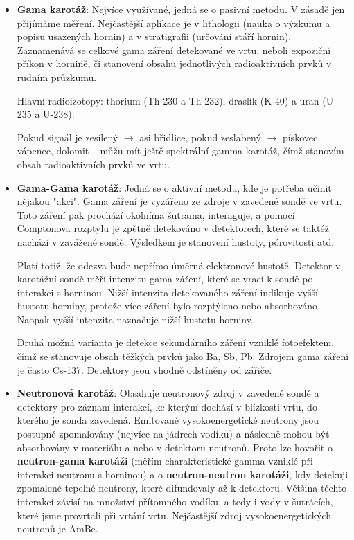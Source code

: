 \begin{itemize}
    \item \textbf{Gama karotáž}: Nejvíce využívané, jedná se o pasivní metodu. V zásadě jen přijímáme měření. Nejčastější aplikace je v lithologii (nauka o výzkumu a popisu usazených hornin) a v stratigrafii (určování stáří hornin). Zaznamenává se celkové gama záření detekované ve vrtu, neboli expoziční příkon v hornině, či stanovení obsahu jednotlivých radioaktivních prvků v rudním průzkumu. 
    
    Hlavní radioizotopy: thorium (Th-230 a Th-232), draslík (K-40) a uran (U-235 a U-238).
    
    Pokud signál je zesílený $\rightarrow$ asi břidlice, pokud zeslabený $\rightarrow$ pískovec, vápenec, dolomit -- můžu mít ještě spektrální gamma karotáž, čímž stanovím obsah radioaktivních prvků ve vrtu.

    \item \textbf{Gama-Gama karotáž}: Jedná se o aktivní metodu, kde je potřeba učinit nějakou "akci". Gama záření je vyzářeno ze zdroje v zavedené sondě ve vrtu. Toto záření pak prochází okolníma šutrama, interaguje, a pomocí Comptonova rozptylu je zpětně detekováno v detektorech, které se taktéž nachází v zavážené sondě. Výsledkem je stanovení hustoty, pórovitosti atd.
    
    Platí totiž, že odezva bude nepřímo úměrná elektronové hustotě. Detektor v karotážní sondě měří intenzitu gama záření, které se vrací k sondě po interakci s horninou. Nižší intenzita detekovaného záření indikuje vyšší hustotu horniny, protože více záření bylo rozptýleno nebo absorbováno. Naopak vyšší intenzita naznačuje nižší hustotu horniny. 
    
    Druhá možná varianta je detekce sekundárního záření vzniklé fotoefektem, čímž se stanovuje obsah těžkých prvků jako Ba, Sb, Pb. Zdrojem gama záření je často Cs-137. Detektory jsou vhodně odstíněny od zářiče.

    \item \textbf{Neutronová karotáź}: Obsahuje neutronový zdroj v zavedené sondě a detektory pro záznam interakcí, ke kterým dochází v blízkosti vrtu, do kterého je sonda zavedená. Emitované vysokoenergetické neutrony jsou postupně zpomalovány (nejvíce na jádrech vodíku) a následně mohou být absorbovány v materiálu a nebo v detektoru neutronů. Proto lze hovořit o \textbf{neutron-gama karotáži} (měřím charakteristické gamma vzniklé při interakci neutronu s horninou) a o \textbf{neutron-neutron karotáži}, kdy detekuji zpomalené tepelné neutrony, které difundovaly až k detektoru. Většina těchto interakcí závisí na množství přítomného vodíku, a tedy i vody v šutrácích, které jsme provrtali při vrtání vrtu. Nejčastější zdroj vysokoenergetických neutronů je AmBe.


\end{itemize}
